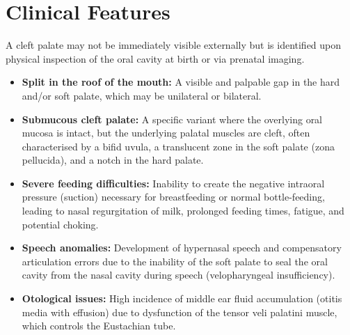 \section*{Clinical Features}
A cleft palate may not be immediately visible externally but is identified upon physical inspection of the oral cavity at birth or via prenatal imaging.
\begin{itemize}
    \item \textbf{Split in the roof of the mouth:} A visible and palpable gap in the hard and/or soft palate, which may be unilateral or bilateral.
    \item \textbf{Submucous cleft palate:} A specific variant where the overlying oral mucosa is intact, but the underlying palatal muscles are cleft, often characterised by a bifid uvula, a translucent zone in the soft palate (zona pellucida), and a notch in the hard palate.
    \item \textbf{Severe feeding difficulties:} Inability to create the negative intraoral pressure (suction) necessary for breastfeeding or normal bottle-feeding, leading to nasal regurgitation of milk, prolonged feeding times, fatigue, and potential choking.
    \item \textbf{Speech anomalies:} Development of hypernasal speech and compensatory articulation errors due to the inability of the soft palate to seal the oral cavity from the nasal cavity during speech (velopharyngeal insufficiency).
    \item \textbf{Otological issues:} High incidence of middle ear fluid accumulation (otitis media with effusion) due to dysfunction of the tensor veli palatini muscle, which controls the Eustachian tube.
\end{itemize}

